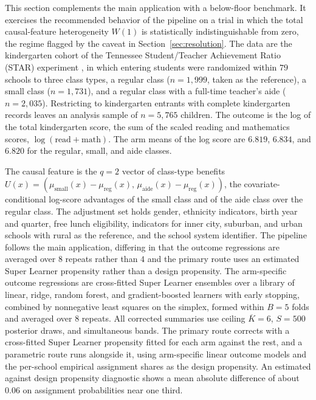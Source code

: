 \documentclass[11pt]{article}
\begin{document}
This section complements the main application with a below-floor benchmark. It exercises the recommended behavior of the pipeline on a trial in which the total causal-feature heterogeneity $W(1)$ is statistically indistinguishable from zero, the regime flagged by the caveat in Section~\ref{sec:resolution}. The data are the kindergarten cohort of the Tennessee Student/Teacher Achievement Ratio (STAR) experiment \citep{finn1990}, in which entering students were randomized within $79$ schools to three class types, a regular class ($n=1{,}999$, taken as the reference), a small class ($n=1{,}731$), and a regular class with a full-time teacher's aide ($n=2{,}035$). Restricting to kindergarten entrants with complete kindergarten records leaves an analysis sample of $n=5{,}765$ children. The outcome is the log of the total kindergarten score, the sum of the scaled reading and mathematics scores, $\log(\text{read}+\text{math})$. The arm means of the log score are $6.819$, $6.834$, and $6.820$ for the regular, small, and aide classes.

The causal feature is the $q=2$ vector of class-type benefits $U(x)=(\mu_{\mathrm{small}}(x)-\mu_{\mathrm{reg}}(x),\,\mu_{\mathrm{aide}}(x)-\mu_{\mathrm{reg}}(x))$, the covariate-conditional log-score advantages of the small class and of the aide class over the regular class. The adjustment set holds gender, ethnicity indicators, birth year and quarter, free lunch eligibility, indicators for inner city, suburban, and urban schools with rural as the reference, and the school system identifier. The pipeline follows the main application, differing in that the outcome regressions are averaged over $8$ repeats rather than $4$ and the primary route uses an estimated Super Learner propensity rather than a design propensity. The arm-specific outcome regressions are cross-fitted Super Learner ensembles over a library of linear, ridge, random forest, and gradient-boosted learners with early stopping, combined by nonnegative least squares on the simplex, formed within $B=5$ folds and averaged over $8$ repeats. All corrected summaries use ceiling $\overline K=6$, $S=500$ posterior draws, and simultaneous bands. The primary route corrects with a cross-fitted Super Learner propensity fitted for each arm against the rest, and a parametric route runs alongside it, using arm-specific linear outcome models and the per-school empirical assignment shares as the design propensity. An estimated against design propensity diagnostic shows a mean absolute difference of about $0.06$ on assignment probabilities near one third.
\end{document}
